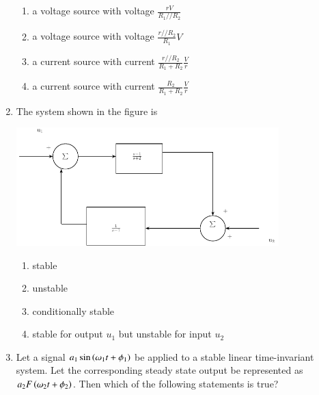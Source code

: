 \documentclass[journal,12pt,onecolumn]{IEEEtran}
\theoremstyle{remark}
\begin{document}
\begin{enumerate}
\begin{enumerate}
    \item a voltage source with voltage $\frac{rV}{R_1 // R_2}$\\
    \item a voltage source with voltage $\frac{r//R_2}{R_1}V$\\
    \item a current source with current $\frac{r//R_2}{R_1 + R_2}\frac{V}{r}$\\
    \item a current source with current $\frac{R_2}{R_1 + R_2}\frac{V}{r}$
\end{enumerate}
\item The system shown in the figure is
	 \begin{center}
\includegraphics[width=0.8\textwidth]{figs/fig10/main} %
\end{center}
\begin{enumerate}
    \item stable
    \item unstable
    \item conditionally stable
    \item stable for output $u_1$ but unstable for input $u_2$\\
\end{enumerate}
\item Let a signal $a_1 \sin\left(\omega_1 t + \phi_1\right)$ be applied to a stable linear time-invariant system. Let the corresponding steady state output be represented as $a_2 F\left(\omega_2 t + \phi_2\right)$. Then which of the following statements is true?


\end{enumerate}
\end{document}
